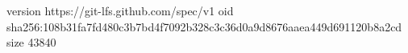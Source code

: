 version https://git-lfs.github.com/spec/v1
oid sha256:108b31fa7fd480c3b7bd4f7092b328c3c36d0a9d8676aaea449d691120b8a2cd
size 43840
